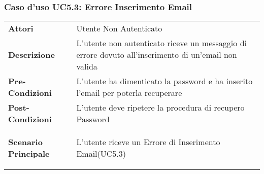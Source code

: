 \subsubsection{Caso d'uso UC5.3:  Errore Inserimento Email}
\label{UC5_3}

\begin{longtable}{ l | p{11cm}}
	\hline
	\rowcolor{Gray}
	 \multicolumn{2}{c}{UC5.3 - Errore Inserimento Email} \\
	 \hline
	\textbf{Attori} & Utente Non Autenticato \\
	\textbf{Descrizione} & L'utente non autenticato riceve un messaggio di errore dovuto all'inserimento di un'email non valida \\
	\textbf{Pre-Condizioni} & L'utente ha dimenticato la password e ha inserito l'email per poterla recuperare\\
	\textbf{Post-Condizioni} & L'utente deve ripetere la procedura di recupero Password\\
	\textbf{Scenario Principale} & \begin{enumerate*}[label=(\arabic*.),itemjoin={\newline}]
		\item L'utente riceve un Errore di Inserimento Email(UC5.3)
	\end{enumerate*}\\
\end{longtable}